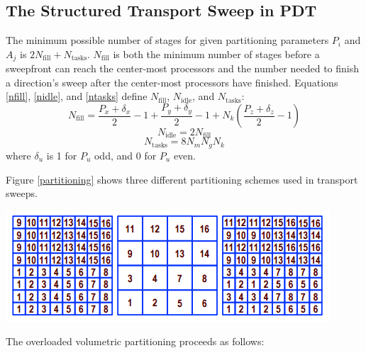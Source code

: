 \documentclass[11pt, letterpaper,titlepage,oneside]{article}
\begin{document}
\subsection{The Structured Transport Sweep in PDT}
The minimum possible number of stages for given partitioning parameters $P_i$ and $A_j$ is $2 N_{\text{fill}}+N_{\text{tasks}}$. $N_{\text{fill}}$ is both the minimum number of stages before a sweepfront can reach the center-most processors and the number needed to finish a direction's sweep after the center-most processors have finished. Equations \ref{nfill}, \ref{nidle}, and \ref{ntasks} define $N_{\text{fill}}$, $N_{\text{idle}}$, and $N_{\text{tasks}}$:
\begin{equation}
N_{\text{fill}} = \frac{P_x + \delta_x}{2} - 1 + \frac{P_y + \delta_y}{2} - 1 + N_k (\frac{P_z + \delta_z}{2} - 1)
\label{nfill}
\end{equation}
\begin{equation}
N_{\text{idle}} = 2 N_{\text{fill}}
\label{nidle}
\end{equation}
\begin{equation}
N_{\text{tasks}} = 8 N_m N_g N_k
\label{ntasks}
\end{equation}
where $\delta_u$ is 1 for $P_u$ odd, and 0 for $P_u$ even.

Figure \ref{partitioning} shows three different partitioning schemes used in transport sweeps. 

\noindent\begin{minipage}{\textwidth}
\centering
\includegraphics[scale = 1]{Partitioning.png}
\label{partitioning}
\end{minipage}

The overloaded volumetric partitioning proceeds as follows:
\end{document}
